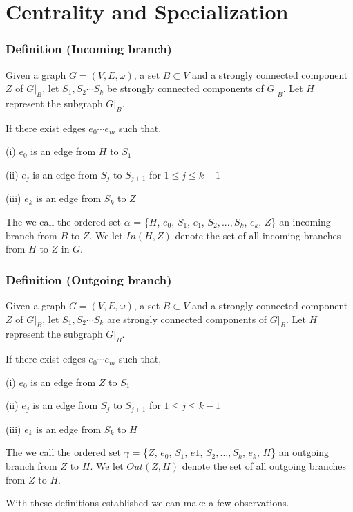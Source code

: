 \documentclass{paper}
\begin{document}
\section*{Centrality and Specialization}



\subsubsection*{Definition (Incoming branch)}

Given a graph $G = (V,E,\omega)$, a set $B \subset V$ and a strongly connected component $Z$ of $G|_{\overline{B}}$, let $S_1,S_2 \cdots S_k$ be strongly connected components of $G|_{\overline{B}}$. Let $H$ represent the subgraph $G|_B$.

If there exist edges $e_0 \cdots e_m$  such that,

(i) $e_0$ is an edge from $H$ to $S_1$

(ii) $e_j$ is an edge from $S_j$ to $S_{j+1}$ for $1 \leq j \leq k-1$

(iii) $e_k$ is an edge from $S_k$ to $Z$

The we call the ordered set $\alpha$ = \{$H$, $e_0$, $S_1$, $e_1$, $S_2,...,S_k$, $e_k$, $Z$\} an incoming branch from $B$ to $Z$. We let $In(H,Z)$ denote the set of all incoming branches from $H$ to $Z$ in $G$.

\subsubsection*{Definition (Outgoing branch)}

Given a graph $G = (V,E,\omega)$, a set $B \subset V$ and a strongly connected component $Z$ of $G|_B$, let $S_1,S_2 \cdots S_k$ are strongly connected components of $G|_B$. Let $H$ represent the subgraph $G|_B$.

If there exist edges $e_0 \cdots e_m$ such that,

(i) $e_0$ is an edge from $Z$ to $S_1$

(ii) $e_j$ is an edge from $S_j$ to $S_{j+1}$ for $1 \leq j \leq k-1$

(iii) $e_k$ is an edge from $S_k$ to $H$

The we call the ordered set $\gamma$ = \{$Z$, $e_0$, $S_1$, $e1$, $S_2,...,S_k$, $e_k$, $H$\} an outgoing branch from $Z$ to $H$. We let $Out(Z,H)$ denote the set of all outgoing branches from $Z$ to $H$.

With these definitions established we can make a few observations. 
\end{document}
